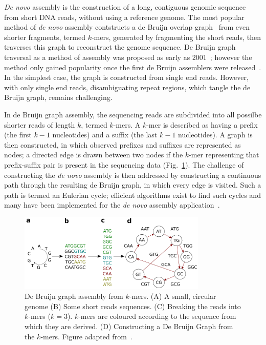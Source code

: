 \textit{De novo} assembly is the construction of a long, contiguous genomic sequence from short DNA reads, without using a reference genome. The most popular method of \textit{de novo} assembly contstructs a de Bruijn overlap graph~\cite{Compeau2011} from even shorter fragments, termed $k$-mers, generated by fragmenting the short reads, then traverses this graph to reconstruct the genome sequence. De Bruijn graph traversal as a method of assembly was proposed as early as 2001~\cite{Pevzner2001}; however the method only gained popularity once the first de Bruijn assemblers were released~\cite{Zerbino2008}. In the simplest case, the graph is constructed from single end reads. However, with only single end reads, disambiguating repeat regions, which tangle the de Bruijn graph, remains challenging. 

In de Bruijn graph assembly, the sequencing reads are subdivided into all possilbe shorter reads of length $k$, termed $k$-mers. A $k$-mer is described as having a prefix (the first $k - 1$ nucleotides) and a suffix (the last $k - 1$ nucleotides). A graph is then constructed, in which observed prefixes and suffixes are represented as nodes; a directed edge is drawn between two nodes if the $k$-mer representing that prefix-suffix pair is present in the sequencing data (Fig.~\ref{fig:de-bruijn}). The challenge of constructing the \textit{de novo} assembly is then addressed by constructing a continuous path through the resulting de Bruijn graph, in which every edge is visited. Such a path is termed an Eulerian cycle; efficient algorithms exist to find such cycles and many have been implemented for the \textit{de novo} assembly application~\cite{Zerbino2008, Bankevich2012, Li2010_SOAP}. 

\begin{figure}
\centerline{\includegraphics[width=0.8\textwidth]{illumina/de_bruijn.pdf}}
\caption{De Bruijn graph assembly from $k$-mers. (A) A small, circular genome (B) Some short reads sequences. (C) Breaking the reads into $k$-mers ($k = 3$). $k$-mers are coloured according to the sequence from which they are derived. (D) Constructing a De Bruijn Graph from the $k$-mers. Figure adapted from~\cite{Compeau2011}.}
\label{fig:de-bruijn}
\end{figure}

